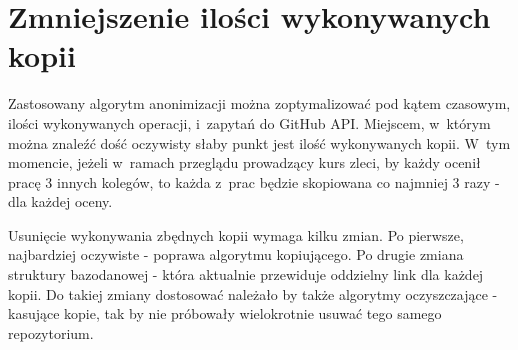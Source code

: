 \section{Zmniejszenie ilości wykonywanych kopii}
Zastosowany algorytm anonimizacji można zoptymalizować pod kątem czasowym, ilości wykonywanych operacji, i~zapytań do GitHub API. Miejscem, w~którym można znaleźć dość oczywisty słaby punkt jest ilość wykonywanych kopii. W~tym momencie, jeżeli w~ramach przeglądu prowadzący kurs zleci, by każdy ocenił pracę 3 innych kolegów, to każda z~prac będzie skopiowana co najmniej 3 razy - dla każdej oceny.

\medskip
Usunięcie wykonywania zbędnych kopii wymaga kilku zmian. Po pierwsze, najbardziej oczywiste - poprawa algorytmu kopiującego. Po drugie zmiana struktury bazodanowej - która aktualnie przewiduje oddzielny link dla każdej kopii. Do takiej zmiany dostosować należało by także algorytmy oczyszczające - kasujące kopie, tak by nie próbowały wielokrotnie usuwać tego samego repozytorium.


